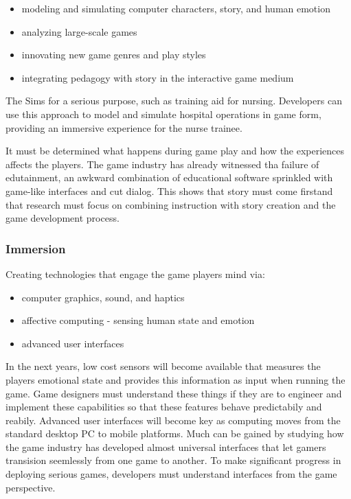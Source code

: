         \begin{itemize}
          \item modeling and simulating computer characters, story, and human emotion
          \item analyzing large-scale games
          \item innovating new game genres and play styles
          \item integrating pedagogy with story  in the interactive game medium 
        \end{itemize}

      The Sims for a serious purpose, such as training aid for nursing. Developers can use this approach to model and simulate hospital operations in game form, providing an immersive experience for the nurse trainee. 

      It must be determined what happens during game play and how the experiences affects the players. The game industry has already witnessed tha failure of edutainment, an awkward combination of educational software sprinkled with game-like interfaces and cut dialog. This shows that story must come firstand that research must focus on combining instruction with story creation and the game development process. 

      \subsubsection*{Immersion}
      Creating technologies that engage the game players mind via:
        \begin{itemize}
          \item computer graphics, sound, and haptics
          \item affective computing - sensing human state and emotion
          \item advanced user interfaces
        \end{itemize}
      In the next years, low cost sensors will become available that measures the players emotional state and provides this information as input when running the game. Game designers must understand these things if they are to engineer and implement these capabilities so that these features behave predictabily and reabily.
      Advanced user interfaces will become key as computing moves from the standard desktop PC to mobile platforms. Much can be gained by studying how the game industry has developed almost universal interfaces that let gamers transision seemlessly from one game to another. To make significant progress in deploying serious games, developers must understand interfaces from the game perspective. 

